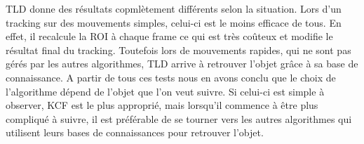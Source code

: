 TLD donne des résultats copmlètement différents selon la situation. Lors d'un tracking sur des mouvements simples, celui-ci est le moins efficace de tous. En effet, il recalcule la ROI à chaque frame ce qui est très coûteux et modifie le résultat final du tracking. Toutefois lors de mouvements rapides, qui ne sont pas gérés par les autres algorithmes, TLD arrive à retrouver  l'objet grâce à sa base de connaissance.
A partir de tous ces tests nous en avons conclu que le choix de l'algorithme dépend de l'objet que l'on veut suivre. Si celui-ci est simple à observer, KCF est le plus approprié, mais lorsqu'il commence à être plus compliqué à suivre, il est préférable de se tourner vers les autres algorithmes qui utilisent leurs bases de connaissances pour retrouver l'objet.
